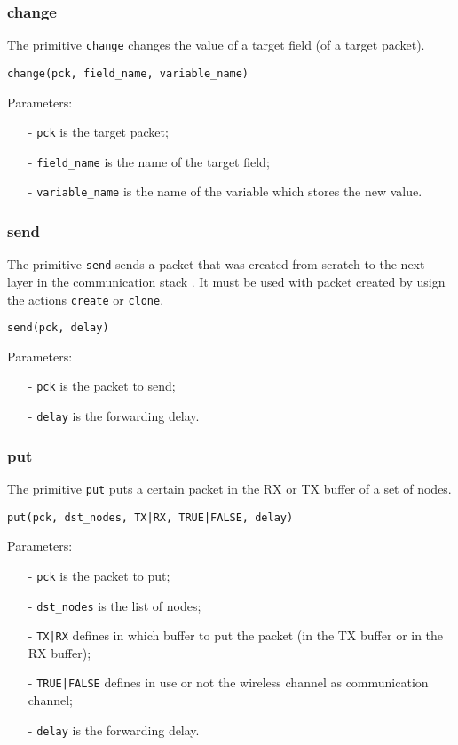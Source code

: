 \subsubsection{change}
The primitive \texttt{change} changes the value of a target field (of a target packet).
%
\begin{lstlisting}[language={adl}]
change(pck, field_name, variable_name)
\end{lstlisting}
%
Parameters:
%
\begin{itemize}
\item[-] \texttt{pck} is the target packet;
\item[-] \texttt{field\_name} is the name of the target field;
\item[-] \texttt{variable\_name} is the name of the variable which stores the new value.
\end{itemize}

\subsubsection{send}
The primitive \texttt{send} sends a packet that was created from scratch to the next layer in the communication stack . It must be used with packet created by usign the actions \texttt{create} or \texttt{clone}.
%
\begin{lstlisting}[language={adl}]
send(pck, delay)
\end{lstlisting}
%
Parameters:
%
\begin{itemize}
\item[-] \texttt{pck} is the packet to send;
\item[-] \texttt{delay} is the forwarding delay.
\end{itemize}

\subsubsection{put}
The primitive \texttt{put} puts a certain packet in the RX or TX buffer of a set of nodes.
%
\begin{lstlisting}[language={adl}]
put(pck, dst_nodes, TX|RX, TRUE|FALSE, delay)
\end{lstlisting}
%
Parameters:
%
\begin{itemize}
\item[-] \texttt{pck} is the packet to put;
\item[-] \texttt{dst\_nodes} is the list of nodes;
\item[-] \texttt{TX|RX} defines in which buffer to put the packet (in the TX buffer or in the RX buffer);
\item[-] \texttt{TRUE|FALSE} defines in use or not the wireless channel as communication channel;
\item[-] \texttt{delay} is the forwarding delay.
\end{itemize}














